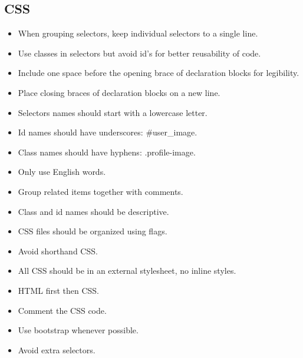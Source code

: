 \documentclass[paper=a4, fontsize=11pt]{scrartcl} %
\numberwithin{equation}{section} %
\numberwithin{figure}{section} %
\numberwithin{table}{section} %
\begin{document}
  \subsection{CSS}
  \begin{itemize}
    \item When grouping selectors, keep individual selectors to a single line.
    \item Use classes in selectors but avoid id's for better reusability of code.
    \item Include one space before the opening brace of declaration blocks for legibility.
    \item Place closing braces of declaration blocks on a new line.
    \item Selectors names should start with a lowercase letter.
    \item Id names should have underscores: \#user\_image.
    \item Class names should have hyphens: .profile-image.
    \item Only use English words.
    \item Group related items together with comments.
    \item Class and id names should be descriptive.
    \item CSS files should be organized using flags.
    \item Avoid shorthand CSS.
    \item All CSS should be in an external stylesheet, no inline styles.
    \item HTML first then CSS.
    \item Comment the CSS code.
    \item Use bootstrap whenever possible.
    \item Avoid extra selectors.
  \end{itemize}
  
\end{document}
